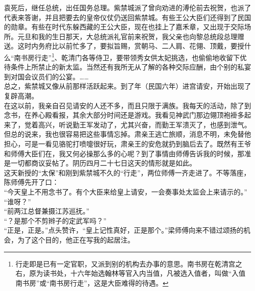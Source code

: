 袁死后，继任总统，出任国务总理。紫禁城派了曾向劝进的溥伦前去祝贺，也派了代表来答谢，并且把要去的皇帝仪仗仍送回紫禁城。有些王公大臣们还得到了民国的勋章。有些在时代东躲西藏的王公大臣，现在也挂上了嘉禾章，又出现于交际场所。元旦和我的生日那天，大总统派礼官前来祝贺，我父亲也向黎总统段总理赠送。这时内务府比以前忙多了，要拟旨赐，赏朝马、二人肩、花翎、顶戴，要授什么“南书房行走”\footnote{行走即是已有一定官职，又派到别的机构去办事的意思。南书房在乾清宫之右，原为读书处，十六年始选翰林等官入内当值，凡被选入值者，叫做“入值南书房”或“南书房行走”，这是大臣难得的待遇。}、乾清门各等侍卫，要带领秀女供太妃挑选，也偷偷地收留下优待条件上所禁止的新太监。当然还有我所无从了解的各种交际应酬，由个别的私宴到对国会议员们的公宴。……\\

总之，紫禁城又像从前那样活跃起来。到了年（民国六年）进宫请安，开始出现了复辟高潮。\\

在这以前，我亲自召见请安的人还不多，而且只限于满族。我每天的活动，除了到念书，在养心殿看报，其余大部分时间还是游戏。我看见神武门那边翎顶袍褂多起来了，觉着高兴，听说勤王军发动了，尤其兴奋，而勤王军溃灭了，也感到泄气。但总的说来，我也很容易把这些事情忘掉。肃亲王逃亡旅顺，消息不明，未免替他担心，可是一看见骆驼打喷嚏很好玩，肃亲王的安危就扔到脑后去了。既然有王爷和师傅大臣们在，我又何必操那么多的心呢？到了事情由师傅告诉我的时候，那准是一切都商议妥帖了。阴历四月二十七日这天的情形就是如此。\\

这天新授的“太保”和刚到紫禁城不久的“行走”，两位师傅一齐走进了。不等落座，陈师傅先开了口：\\

“今天皇上不用念书了。有个大臣来给皇上请安，一会奏事处太监会上来请示的。”\\

“谁呀？”\\

“前两江总督兼摄江苏巡抚。”\\

“？是那个不剪辫子的定武军吗？”\\

“正是，正是。”点头赞许，“皇上记性真好，正是那个。”梁师傅向来不错过颂扬的机会，为了这个目的，他正在写我的起居注。\\

